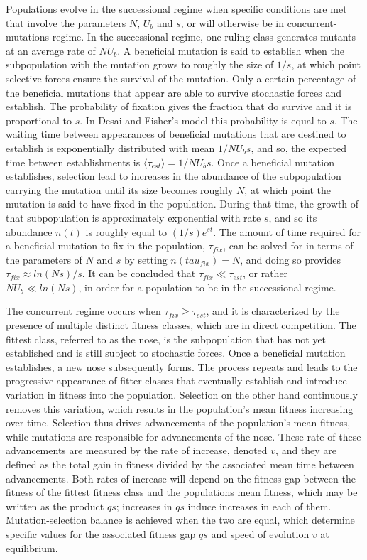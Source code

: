 \documentclass[12pt, two column]{article}
\begin{document}
Populations evolve in the successional regime when specific conditions are met that involve the parameters $N$, $U_b$ and $s$, or will otherwise be in concurrent-mutations regime.  In the successional regime, one ruling class generates mutants at an average rate of $N U_b$.  A beneficial mutation is said to establish when the subpopulation with the mutation grows to roughly the size of $1/s$, at which point selective forces ensure the survival of the mutation.  Only a certain percentage of the beneficial mutations that appear are able to survive stochastic forces and establish.  The probability of fixation gives the fraction that do survive and it is proportional to $s$.  In Desai and Fisher's model this probability is equal to $s$.  The waiting time between appearances of beneficial mutations that are destined to establish is exponentially distributed with mean $1/NU_b s$, and so, the expected time between establishments is $\langle \tau_{est} \rangle = 1/NU_b s$.  Once a beneficial mutation establishes, selection lead to increases in the abundance of the subpopulation carrying the mutation until its size becomes roughly $N$, at which point the mutation is said to have fixed in the population.  During that time, the growth of that subpopulation is approximately exponential with rate $s$, and so its abundance $n(t)$ is roughly equal to $(1/s) e^{st}$.  The amount of time required for a beneficial mutation to fix in the population, $\tau_{fix}$, can be solved for in terms of the parameters of $N$ and $s$ by setting $n(tau_{fix})=N$, and doing so provides $\tau_{fix} \approx ln(Ns)/s$.  It can be concluded that $\tau_{fix} \ll \tau_{est}$, or rather $N U_b \ll ln(Ns)$, in order for a population to be in the successional regime. 

The concurrent regime occurs when $\tau_{fix} \ge \tau_{est}$, and it is characterized by the presence of multiple distinct fitness classes, which are in direct competition.  The fittest class, referred to as the nose, is the subpopulation that has not yet established and is still subject to stochastic forces.  Once a beneficial mutation establishes, a new nose subsequently forms.  The process repeats and leads to the progressive appearance of fitter classes that eventually establish and introduce variation in fitness into the population.  Selection on the other hand continuously removes this variation, which results in the population's mean fitness increasing over time.  Selection thus drives advancements of the population's mean fitness, while mutations are responsible for advancements of the nose.  These rate of these advancements are measured by the rate of increase, denoted $v$, and they are defined as the total gain in fitness divided by the associated mean time between advancements.  Both rates of increase will depend on the fitness gap between the fitness of the fittest fitness class and the populations mean fitness, which may be written as the product $qs$; increases in $qs$ induce increases in each of them.  Mutation-selection balance is achieved when the two are equal, which determine specific values for the associated fitness gap $qs$ and speed of evolution $v$ at equilibrium. 
\end{document}
